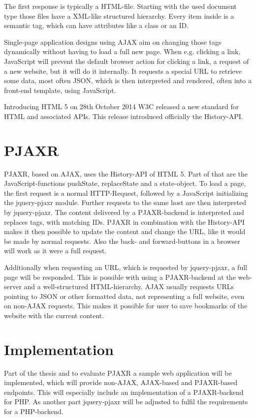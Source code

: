 \documentclass[f,bachelor,binding,twoside,palatino]{WeSTthesis}
\def \ajax {AJAX}
\def \pjaxr {PJAXR}
\def \jqueryPjaxr {jquery-pjaxr}
\begin{document}
  The first response is typically a HTML-file.
  Starting with the used document type those files have a XML-like structured hierarchy.
  Every item inside is a semantic tag, which can have attributes like a class or an ID.

  Single-page application designs using \ajax{} aim on changing those tags dynamically without having to load a full new page.
  When e.g. clicking a link, JavaScript will prevent the default browser action for clicking a link, a request of a new website, but it will do it internally.
  It requests a special URL to retrieve some data, most often JSON, which is then interpreted and rendered, often into a front-end template, using JavaScript.

  Introducing HTML 5 on 28th October 2014 W3C released a new standard for HTML and associated APIs. 
  This release introduced officially the History-API.
  
\section{\pjaxr{}}
  \pjaxr{}, based on \ajax{}, uses the History-API of HTML 5.
  Part of that are the JavaScript-functions pushState, replaceState and a state-object.
  To load a page, the first request is a normal HTTP-Request, followed by a JavaScript initializing the \jqueryPjaxr{} module.
  Further requests to the same host are then interpreted by \jqueryPjaxr{}.
  The content delivered by a \pjaxr{}-backend is interpreted and replaces tags, with matching IDs.
  \pjaxr{} in combination with the History-API makes it then possible to update the content and change the URL, like it would be made by normal requests.
  Also the back- and forward-buttons in a browser will work as it were a full request.
  
  Additionally when requesting an URL, which is requested by \jqueryPjaxr{}, a full page will be responded.
  This is possible with using a \pjaxr{}-backend at the web-server and a well-structured HTML-hierarchy.
  \ajax{} usually requests URLs pointing to JSON or other formatted data, not representing a full website, even on non-\ajax{} requests.
  This makes it possible for user to save bookmarks of the website with the current content.

\section{Implementation}
  Part of the thesis and to evaluate \pjaxr{} a sample web application will be implemented, which will provide non-\ajax{}, \ajax{}-based and \pjaxr{}-based endpoints.
  This will especially include an implementation of a \pjaxr{}-backend for PHP. As another part \jqueryPjaxr{} will be adjusted to fulfil the requirements for a PHP-backend.
\end{document}
